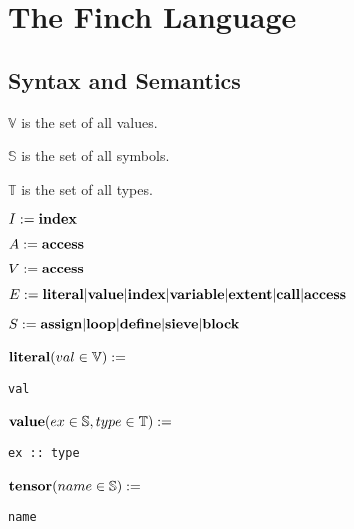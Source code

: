 
\section{The Finch Language}

\subsection{Syntax and Semantics}

$\mathbb{V}$ is the set of all values.

$\mathbb{S}$ is the set of all symbols.

$\mathbb{T}$ is the set of all types.

$I := \text{\textbf{index}}$

$A := \text{\textbf{access}}$

$V := \text{\textbf{access}}$

$E := \text{\textbf{literal}} | \text{\textbf{value}} | \text{\textbf{index}} | \text{\textbf{variable}} | \text{\textbf{extent}} | \text{\textbf{call}} | \text{\textbf{access}}$

$S := \text{\textbf{assign}} | \text{\textbf{loop}} | \text{\textbf{define}} | \text{\textbf{sieve}} | \text{\textbf{block}}$


\newlength{\leftwidth}
\setlength{\leftwidth}{.4\linewidth}
\newlength{\rightwidth}
\setlength{\rightwidth}{.6\linewidth}

\noindent\begin{minipage}{\leftwidth}
\raggedleft $\text{\textbf{literal}}(val \in \mathbb{V}) :=$~
\end{minipage}%
\begin{minipage}{\rightwidth}
\begin{verbatim}
val
\end{verbatim}
\end{minipage}

\noindent\begin{minipage}{\leftwidth}
\raggedleft $\text{\textbf{value}}(ex \in \mathbb{S}, type \in \mathbb{T}) :=$~
\end{minipage}%
\begin{minipage}{\rightwidth}
\begin{verbatim}
ex :: type
\end{verbatim}
\end{minipage}

\noindent\begin{minipage}{\leftwidth}
\raggedleft $\text{\textbf{tensor}}(name \in \mathbb{S}) :=$~
\end{minipage}%
\begin{minipage}{\rightwidth}
\begin{verbatim}
name
\end{verbatim}
\end{minipage}

